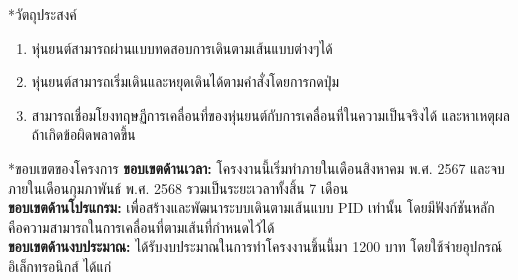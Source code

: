 \documentclass[14pt, fleqn, a4paper]{extarticle}
\makeatletter
\renewcommand\section{%
  \@ifstar{\flatsection}{\@section}%
}
\newcommand{\flatsection}[1]{%
   \par\medskip\noindent
   {\bfseries #1\par}
}
\makeatother
\begin{document}
\vspace{-0.5em}

\section*{วัตถุประสงค์}
	\vspace{-0.3em}
	\begin{enumerate}[itemsep=0pt, topsep=0pt, partopsep=0pt]
		\item หุ่นยนต์สามารถผ่านแบบทดสอบการเดินตามเส้นแบบต่างๆได้
		\item หุ่นยนต์สามารถเริ่มเดินและหยุดเดินได้ตามคำสั่งโดยการกดปุ่ม
		\item สามารถเชื่อมโยงทฤษฏีการเคลื่อนที่ของหุ่นยนต์กับการเคลื่อนที่ในความเป็นจริงได้  และหาเหตุผลถ้าเกิดข้อผิดพลาดขึ้น
	\end{enumerate}
	\vspace{-0.3em}

\section*{ขอบเขตของโครงการ} \vspace{-0.5em}
\textbf{ขอบเขตด้านเวลา:} โครงงานนี้เริ่มทำภายในเดือนสิงหาคม พ.ศ. 2567 และจบภายในเดือนกุมภาพันธ์ พ.ศ. 2568 รวมเป็นระยะเวลาทั้งสิ้น 7 เดือน \\
\indent\textbf{ขอบเขตด้านโปรแกรม:} เพื่อสร้างและพัฒนาระบบเดินตามเส้นแบบ PID เท่านั้น โดยมีฟังก์ชันหลัก คือความสามารถในการเคลื่อนที่ตามเส้นที่กำหนดไว้ได้ \\
\indent\textbf{ขอบเขตด้านงบประมาณ:} ได้รับงบประมาณในการทำโครงงานชิ้นนี้มา 1200 บาท โดยใช้จ่ายอุปกรณ์อิเล็กทรอนิกส์ ได้แก่
\end{document}
